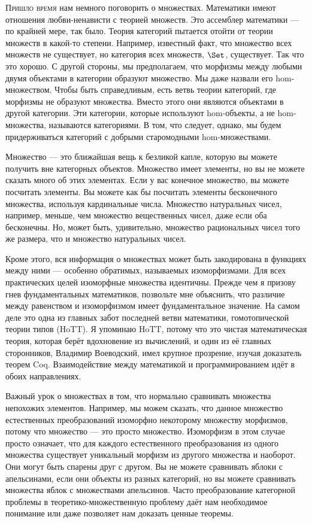 
\lettrine[lhang=0.17]{П}{ришло время} нам немного поговорить о множествах.
Математики имеют отношения любви-ненависти с теорией множеств. Это
ассемблер математики --- по крайней мере, так было. Теория
категорий пытается отойти от теории множеств в какой-то степени. Например,
известный факт, что множество всех множеств не существует, но категория
всех множеств, $\Set$, существует. Так что это хорошо. С другой стороны, мы предполагаем, что
морфизмы между любыми двумя объектами в категории образуют множество. Мы даже
назвали его hom-множеством. Чтобы быть справедливым, есть ветвь теории категорий,
где морфизмы не образуют множества. Вместо этого они являются объектами в другой
категории. Эти категории, которые используют hom-объекты, а не hom-множества,
называются  категориями. В том, что следует, однако, мы будем
придерживаться категорий с добрыми старомодными hom-множествами.

Множество --- это ближайшая вещь к безликой капле, которую вы можете получить вне
категорных объектов. Множество имеет элементы, но вы не можете сказать много об
этих элементах. Если у вас конечное множество, вы можете посчитать элементы.
Вы можете как бы посчитать элементы бесконечного множества, используя кардинальные
числа. Множество натуральных чисел, например, меньше, чем
множество вещественных чисел, даже если оба бесконечны. Но, может быть,
удивительно, множество рациональных чисел того же размера, что и множество
натуральных чисел.

Кроме этого, вся информация о множествах может быть закодирована в
функциях между ними --- особенно обратимых, называемых
изоморфизмами. Для всех практических целей изоморфные множества
идентичны. Прежде чем я призову гнев фундаментальных математиков, позвольте
мне объяснить, что различие между равенством и изоморфизмом имеет
фундаментальное значение. На самом деле это одна из главных забот
последней ветви математики, гомотопической теории типов (HoTT). Я
упоминаю HoTT, потому что это чистая математическая теория, которая берёт
вдохновение из вычислений, и один из её главных сторонников, Владимир
Воеводский, имел крупное прозрение, изучая доказатель теорем Coq.
Взаимодействие между математикой и программированием идёт в обоих направлениях.

Важный урок о множествах в том, что нормально сравнивать множества
непохожих элементов. Например, мы можем сказать, что данное множество естественных
преобразований изоморфно некоторому множеству морфизмов, потому что множество ---
это просто множество. Изоморфизм в этом случае просто означает, что для каждого естественного
преобразования из одного множества существует уникальный морфизм из другого
множества и наоборот. Они могут быть спарены друг с другом. Вы не можете
сравнивать яблоки с апельсинами, если они объекты из разных
категорий, но вы можете сравнивать множества яблок с множествами апельсинов.
Часто преобразование категорной проблемы в теоретико-множественную проблему
даёт нам необходимое понимание или даже позволяет нам доказать ценные теоремы.

